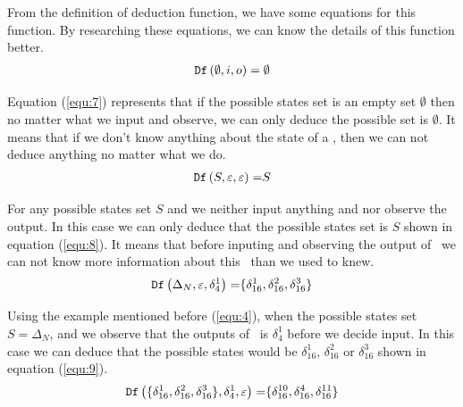  From the definition of deduction function, we have some equations for this function. By researching these equations, we can know the details of this function better.
\begin{equation}
\begin{split}
{\tt Df}\left(\emptyset,i,o\right)=\emptyset\\
\end{split}
\label{equ:7}
\end{equation}

Equation (\ref{equ:7}) represents that if the possible states set is an empty set $\emptyset$ then no matter what we input and observe, we can only deduce the possible set is $\emptyset$. It means that if we don't know anything about the state of a \BCN, then we can not deduce anything no matter what we do.
\begin{equation}
\begin{split}
{\tt Df}\left(S,\varepsilon,\varepsilon\right)=&S\\
\end{split}
\label{equ:8}
\end{equation}

For any possible states set $S$ and we neither input anything and nor observe the output. In this case we can only deduce that the possible states set is $S$ shown in equation (\ref{equ:8}). It means that before inputing and observing the output of \BCN\ we can not know more information about this \BCN\ than we used to knew.
\begin{equation}
\begin{split}
{\tt Df}\left(\Delta_N,\varepsilon,\delta_4^1\right)=&\{\delta_{16}^1,\delta_{16}^2,\delta_{16}^3\}\\
\end{split}
\label{equ:9}
\end{equation}
 
 Using the example mentioned before (\ref{equ:4}), when the possible states set $S=\Delta_N$, and  we observe that the outputs of \BCN\ is $\delta_4^1$ before we decide input. In this case we can deduce that the possible states would be $\delta_{16}^1$, $\delta_{16}^2$ or  $\delta_{16}^3$ shown in equation (\ref{equ:9}).
\begin{equation}
\begin{split}
{\tt Df}\left(\{\delta_{16}^1,\delta_{16}^2,\delta_{16}^3\},\delta_4^1,\varepsilon\right)=&\{\delta_{16}^{10},\delta_{16}^4,\delta_{16}^{11}\}\\
\end{split}
\label{equ:10}
\end{equation}

